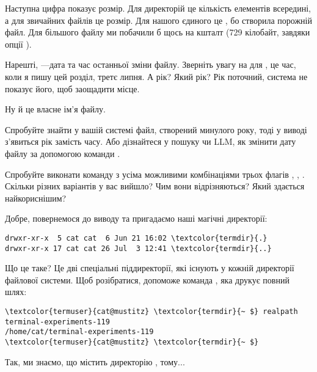 Наступна цифра показує розмір.
Для директорій це кількість елементів всередині, а для звичайних файлів це розмір.
Для нашого єдиного  це , бо  створила порожній файл.
Для більшого файлу ми побачили б щось на кшталт  (729 кілобайт, завдяки опції ).

Нарешті, ---дата та час останньої зміни файлу.
Зверніть увагу на  для , це час, коли я пишу цей розділ, третє липня.
А рік? Який рік?
Рік поточний, система не показує його, щоб заощадити місце.

Ну й  це власне ім'я файлу.

\begin{exercise}
Спробуйте знайти у вашій системі файл, створений минулого року,
тоді у виводі  з'явиться рік замість часу.
Або дізнайтеся у пошуку чи LLM, як змінити дату файлу за допомогою команди .
\end{exercise}

\begin{exercise}
Спробуйте виконати команду  з усіма можливими комбінаціями трьох флагів , , .
Скільки різних варіантів у вас вийшло? Чим вони відрізняються? Який здається найкориснішим?
\end{exercise}

Добре, повернемося до виводу та пригадаємо наші магічні директорії:

\begin{Verbatim}[fontsize=\footnotesize,commandchars=\\\{\},xleftmargin=\parindent]
drwxr-xr-x  5 cat cat  6 Jun 21 16:02 \textcolor{termdir}{.}
drwxr-xr-x 17 cat cat 26 Jul  3 12:41 \textcolor{termdir}{..}
\end{Verbatim}

Що це таке?
Це дві спеціальні піддиректорії, які існують у кожній директорії файлової системи.
Щоб розібратися, допоможе команда , яка друкує повний шлях:

\begin{Verbatim}[fontsize=\footnotesize,commandchars=\\\{\},xleftmargin=\parindent]
\textcolor{termuser}{cat@mustitz} \textcolor{termdir}{~ $} realpath terminal-experiments-119
/home/cat/terminal-experiments-119
\textcolor{termuser}{cat@mustitz} \textcolor{termdir}{~ $}
\end{Verbatim}

Так, ми знаємо, що  містить директорію , тому...

